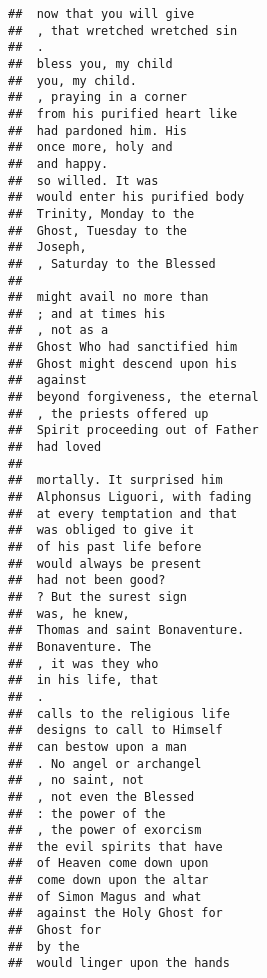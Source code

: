 \documentclass[]{article}
\begin{document}
\begin{verbatim}
##  now that you will give                  
##  , that wretched wretched sin            
##  .                                       
##  bless you, my child                     
##  you, my child.                          
##  , praying in a corner                   
##  from his purified heart like            
##  had pardoned him. His                   
##  once more, holy and                     
##  and happy.                              
##  so willed. It was                       
##  would enter his purified body           
##  Trinity, Monday to the                  
##  Ghost, Tuesday to the                   
##  Joseph,                                 
##  , Saturday to the Blessed               
##                                          
##  might avail no more than                
##  ; and at times his                      
##  , not as a                              
##  Ghost Who had sanctified him            
##  Ghost might descend upon his            
##  against                                 
##  beyond forgiveness, the eternal         
##  , the priests offered up                
##  Spirit proceeding out of Father         
##  had loved                               
##                                          
##  mortally. It surprised him              
##  Alphonsus Liguori, with fading          
##  at every temptation and that            
##  was obliged to give it                  
##  of his past life before                 
##  would always be present                 
##  had not been good?                      
##  ? But the surest sign                   
##  was, he knew,                           
##  Thomas and saint Bonaventure.           
##  Bonaventure. The                        
##  , it was they who                       
##  in his life, that                       
##  .                                       
##  calls to the religious life             
##  designs to call to Himself              
##  can bestow upon a man                   
##  . No angel or archangel                 
##  , no saint, not                         
##  , not even the Blessed                  
##  : the power of the                      
##  , the power of exorcism                 
##  the evil spirits that have              
##  of Heaven come down upon                
##  come down upon the altar                
##  of Simon Magus and what                 
##  against the Holy Ghost for              
##  Ghost for                               
##  by the                                  
##  would linger upon the hands             

\end{verbatim}
\end{document}
